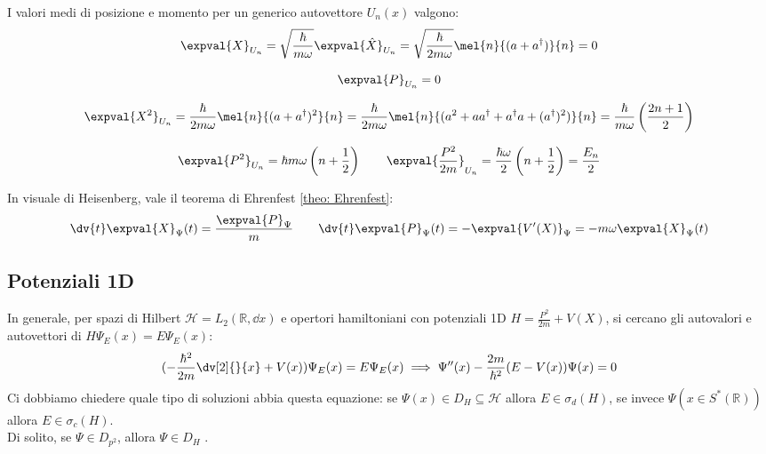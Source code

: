 I valori medi di posizione e momento per un generico autovettore \(U_n(x)\) valgono:
\begin{equation}
    \expval{X}_{U_n} 
        = \sqrt{\frac{\hbar}{m\omega}} \expval{\hat{X}}_{U_n} 
        = \sqrt{\frac{\hbar}{2m\omega}} \mel{n}{(a + a^\dagger)}{n} = 0
\end{equation}

\begin{equation}
    \expval{P}_{U_n} = 0
\end{equation}

\begin{equation}
    \expval{X^2}_{U_n} 
        = \frac{\hbar}{2m\omega} \mel{n}{(a + a^\dagger)^2}{n}
        = \frac{\hbar}{2m\omega} \mel{n}{(a^2 + a a^\dagger + a^\dagger a + (a^\dagger)^2)}{n}
        = \frac{\hbar}{m\omega} \left( \frac{2n + 1}{2} \right)
\end{equation}

\begin{equation}
    \expval{P^2}_{U_n} = \hbar m \omega \left( n + \frac{1}{2} \right)
        \qquad
        \expval{\frac{P^2}{2m}}_{U_n} 
        = \frac{\hbar \omega}{2} \left( n + \frac{1}{2} \right)
        = \frac{E_n}{2}    
\end{equation}

In visuale di Heisenberg, vale il teorema di Ehrenfest \ref{theo: Ehrenfest}:
\begin{equation}
    \dv{t}\expval{X}_{\Psi}(t) = \frac{\expval{P}_{\Psi}}{m}\qquad 
        \dv{t}\expval{P}_{\Psi}(t)= - \expval{V'(X)}_{\Psi}= - m\omega\expval{X}_{\Psi}(t)
\end{equation}


\subsection{Potenziali 1D}
In generale, per spazi di Hilbert \(\mathcal{H}= L_2(\mathbb{R}, \dd{x})\) e opertori hamiltoniani con potenziali 1D \(H = \frac{P^2}{2m}+ V(X)\), si cercano gli autovalori e autovettori di \(H\Psi_E(x)= E\Psi_E(x)\):
\[
    ( - \frac{\hbar^2}{2m} \dv[2]{}{x} + V(x))\Psi_E(x) = E\Psi_E(x)\implies \Psi''(x) - \frac{2m}{\hbar^2}(E - V(x))\Psi(x)=0
\]
Ci dobbiamo chiedere quale tipo di soluzioni abbia questa equazione: se \(\Psi(x)\in D_H\subseteq \mathcal{H}\) allora \(E \in \sigma_d(H)\), se invece \(\Psi(x \in S^*(\mathbb{R}))\) allora \(E \in \sigma_c(H)\).\\
Di solito, se \(\Psi \in D_{p^2}\), allora \(\Psi \in D_H\) .

